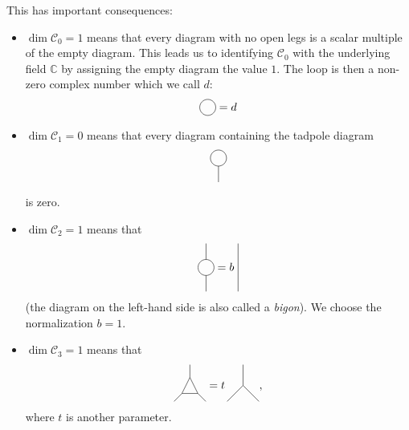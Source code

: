 \documentclass[11pt,oneside]{amsart}
\theoremstyle{plain}%
\theoremstyle{definition}
\theoremstyle{remark}
\begin{document}
This has important consequences:
\begin{itemize}
	\item $\dim\mathcal{C}_0=1$ means that every diagram with no open legs is a scalar multiple of the empty diagram. This leads us to identifying $\mathcal{C}_0$ with the underlying field $\mathbb{C}$ by assigning the empty diagram the value $1$. The loop is then a non-zero complex number which we call $d$:
	\begin{equation}\label{eq:loop}
		\begin{tikzpicture}[scale=0.25,baseline=-1mm]
	    \draw (0, 0) circle [radius=1];
	  \end{tikzpicture}
		=d
	\end{equation}
	\item $\dim\mathcal{C}_1=0$ means that every diagram containing the tadpole diagram
	\begin{equation}
		\begin{tikzpicture}[scale=0.25]
	    \draw (0, 0) circle [radius=1];
	    \draw (0, -3) -- (0, -1);
	  \end{tikzpicture}
	\end{equation}
	is zero.
	\item $\dim\mathcal{C}_2=1$ means that
	\begin{equation}
		\begin{tikzpicture}[scale=0.25,baseline=-1mm]
	    \draw (0, 0) circle [radius=1];
	    \draw (0, 1) -- (0, 3);
	    \draw (0, -3) -- (0, -1);
  	\end{tikzpicture}=b\ %
		\begin{tikzpicture}[scale=0.25,baseline=-1mm]
	    \draw (0, -3) -- (0, 3);
	  \end{tikzpicture}
	\end{equation}
	(the diagram on the left-hand side is also called a \emph{bigon}). We choose the normalization $b=1$.
	\item $\dim\mathcal{C}_3=1$ means that
	\begin{equation}\label{eq:triangle}
		\begin{tikzpicture}[scale=0.5,baseline=4mm]
			\draw (0, 2.3) -- (0, 1.5);
	    \draw (-1, 0) -- (-0.5, 0.5);
			\draw (1, 0) -- (0.5, 0.5);
			\draw (0, 1.5) -- (-0.5, 0.5) -- (0.5, 0.5) -- (0, 1.5);
	  \end{tikzpicture}
		= t\, \begin{tikzpicture}[scale=0.5,baseline=4mm]
		\draw (0, 2.3) -- (0, 1);
		\draw (-1, 0) -- (0, 1) -- (1, 0);
	  \end{tikzpicture},
	\end{equation}
	where $t$ is another parameter.
\end{itemize}
\end{document}
